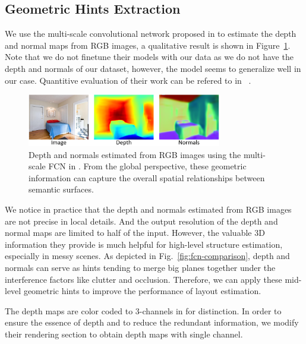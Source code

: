 \subsection{Geometric Hints Extraction}
\label{sec:depth_normal}

We use the multi-scale convolutional network proposed in \cite{eigen2015predicting} to estimate the depth and normal maps from RGB images, a qualitative result is shown in Figure~\ref{fig:depthandnormal}. Note that we do not finetune their models with our data as we do not have the depth and normals of our dataset, however, the model seems to generalize well in our case. Quantitive evaluation of their work can be refered to in ~\cite{eigen2015predicting}.
%

\begin{figure}
	\centering
	\includegraphics[width=8.5cm]{figure/DN.png}
	\caption{Depth and normals estimated from RGB images using the multi-scale FCN in \cite{eigen2015predicting}. From the global perspective, these geometric information can capture the overall spatial relationships between semantic surfaces. }
	\label{fig:depthandnormal}
\end{figure}

We notice in practice that the depth and normals estimated from RGB images are not precise in local details. And the output resolution of the depth and normal maps are limited to half of the input. However, the valuable 3D information they provide is much helpful for high-level structure estimation, especially in messy scenes.  
%
As depicted in Fig.~\ref{fig:fcn-comparison}, depth and normals can serve as hints tending to merge big planes together under the interference factors like clutter and occlusion. 
%
Therefore, we can apply these mid-level geometric hints to improve the performance of layout estimation. 
%


The depth maps are color coded to 3-channels in \cite{eigen2015predicting} for distinction. In order to ensure the essence of depth and to reduce the redundant information, we modify their rendering section to obtain depth maps with single channel.

